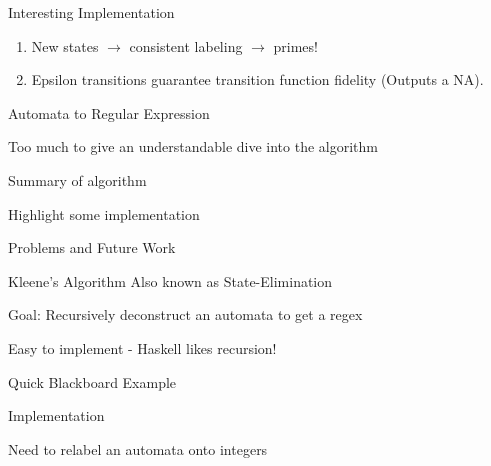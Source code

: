 \documentclass{beamer}
\begin{document}
\begin{frame}{Interesting Implementation}
	\large
	\begin{enumerate}[]
		\item New states $\rightarrow$ consistent labeling $\rightarrow$ primes!
		\item Epsilon transitions guarantee transition function fidelity (Outputs a NA). 
		
	\end{enumerate}
\end{frame}

\begin{frame}{Automata to Regular Expression}
	\centering \Large
	
	Too much to give an understandable dive into the algorithm\vspace{5mm}
	
	Summary of algorithm\vspace{5mm}
	
	Highlight some implementation\vspace{5mm}
	
	Problems and Future Work
\end{frame}

\begin{frame}{Kleene's Algorithm}
	\centering\Large
	Also known as State-Elimination\vspace{5mm}
	
	Goal: Recursively deconstruct an automata to get a regex\vspace{5mm}
	
	Easy to implement - Haskell likes recursion!\vspace{5mm}
	
	Quick Blackboard Example
	
\end{frame}

\begin{frame}[fragile]{Implementation}
	\large
	\begin{center}Need to relabel an automata onto integers 
	\end{center}
	
\end{frame}
\end{document}
